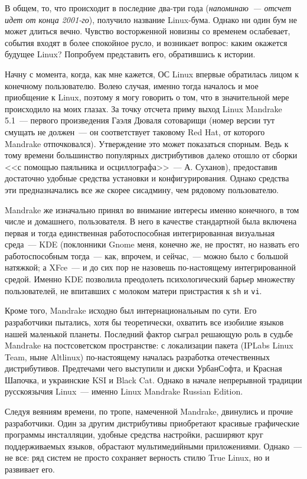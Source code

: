 В общем, то, что происходит в последние два-три года (\textsl{напоминаю~--- отсчет идет от конца 2001-го}), получило название Linux-бума. Однако ни один бум не может длиться вечно. Чувство восторженной новизны со временем ослабевает, события входят в более спокойное русло, и возникает вопрос: каким окажется будущее Linux? Попробуем представить его, обратившись к истории.

Начну с момента, когда, как мне кажется, ОС Linux впервые обратилась лицом к конечному пользователю. Волею случая, именно тогда началось и мое приобщение к Linux, поэтому я могу говорить о том, что в значительной мере происходило на моих глазах. За точку отсчета приму выход Linux Mandrake 5.1~--- первого произведения Гаэля Дюваля сотоварищи (номер версии тут смущать не должен~--- он соответствует таковому Red Hat, от которого Mandrake отпочковался). Утверждение это может показаться спорным. Ведь к тому времени большинство популярных дистрибутивов далеко отошло от сборки <<с помощью паяльника и осциллографа>>~--- А. Суханов), предоставив достаточно удобные средства установки и конфигурирования. Однако средства эти предназначались все же скорее сисадмину, чем рядовому пользователю.

Mandrake же изначально принял во внимание интересы именно конечного, в том числе и домашнего, пользователя. В него в качестве стандартной была включена первая и тогда единственная работоспособная интегрированная визуальная среда~--- KDE (поклонники Gnome меня, конечно же, не простят, но назвать его работоспособным тогда~--- как, впрочем, и сейчас,~--- можно было с большой натяжкой; а XFce~--- и до сих пор не назовешь по-настоящему интегрированной средой. Именно KDE позволила преодолеть психологический барьер множеству пользователей, не впитавших с молоком матери пристрастия к \texttt{sh} и \texttt{vi}.

Кроме того, Mandrake исходно был интернациональным по сути. Его разработчики пытались, хотя бы теоретически, охватить все изобилие языков нашей маленькой планеты. Последний фактор сыграл решающую роль в судьбе Mandrake на постсоветском пространстве: с локализации пакета (IPLabs Linux Team, ныне Altlinux) по-настоящему началась разработка отечественных дистрибутивов. Предтечами чего выступили и диски УрбанСофта, и Красная Шапочка, и украинские KSI и Black Cat. Однако в начале непрерывной традиции русскоязычия Linux~--- именно Linux Mandrake Russian Edition.

Следуя веяниям времени, по тропе, намеченной Mandrake, двинулись и прочие разработчики. Один за другим дистрибутивы приобретают красивые графические программы инсталляции, удобные средства настройки, расширяют круг поддерживаемых языков, обрастают мультимедийными приложениями. Однако~--- не все: ряд систем не просто сохраняет верность стилю True Linux, но и развивает его.

